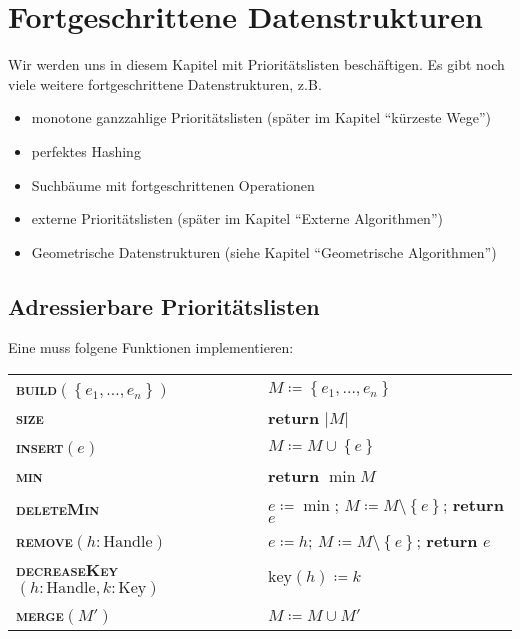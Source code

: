 \chapter{Fortgeschrittene Datenstrukturen}

Wir werden uns in diesem Kapitel mit Prioritätslisten beschäftigen. Es gibt noch viele weitere fortgeschrittene Datenstrukturen, z.B.
\begin{itemize}
  \item monotone ganzzahlige Prioritätslisten (später im Kapitel ``kürzeste Wege'')
  \item perfektes Hashing
  \item Suchbäume mit fortgeschrittenen Operationen
  \item externe Prioritätslisten (später im Kapitel ``Externe Algorithmen'')
  \item Geometrische Datenstrukturen (siehe Kapitel ``Geometrische Algorithmen'')
\end{itemize}

\section{Adressierbare Prioritätslisten}

Eine  muss folgene Funktionen implementieren:

\begin{pseudocode}
  \begin{tabular}{ll}
    \textbf{\textsc{build}}\( (\left \{ e_1,\dots,e_n \right \}) \) & \( M \coloneqq \left \{ e_1,\dots,e_n \right \} \) \\
    \textbf{\textsc{size}} & \textbf{return} \( \left\vert M \right\vert \) \\
    \textbf{\textsc{insert}}\( (e) \) & \( M \coloneqq M \cup \left \{ e \right \} \) \\
    \textbf{\textsc{min}} & \textbf{return} \( \min M \) \\
    \textbf{\textsc{deleteMin}} & \( e \coloneqq \min \); \enskip{} \( M \coloneqq M \setminus \left \{ e \right \} \); \enskip{} \textbf{return} \( e \) \\
    \textbf{\textsc{remove}}\( (h : \text{Handle}) \) & \( e \coloneqq h \); \enskip{} \( M \coloneqq M \setminus \left \{ e \right \} \); \enskip{} \textbf{return} \( e \) \\
    \textbf{\textsc{decreaseKey}}\( (h : \text{Handle}, k : \text{Key}) \) & \( \text{key}(h) \coloneqq k \) \\
    \textbf{\textsc{merge}}\( (M') \) & \( M \coloneqq M \cup M' \)
  \end{tabular}
\end{pseudocode}

